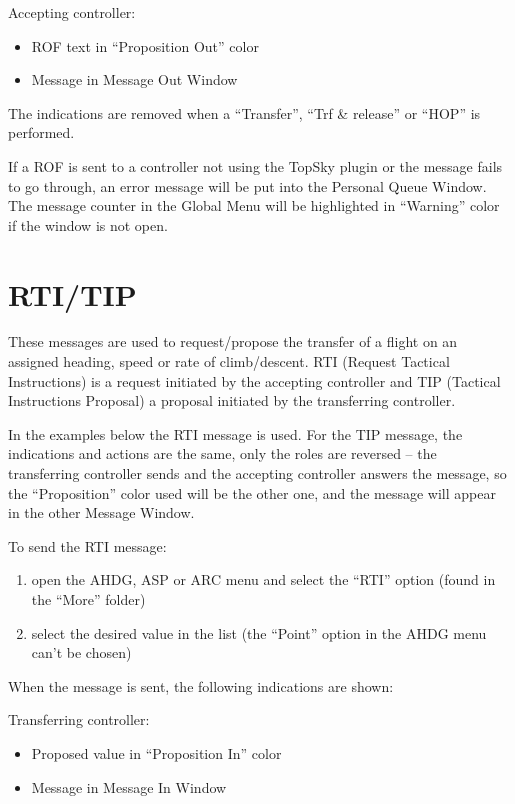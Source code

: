 \documentclass[11pt,a4paper,oldfontcommands]{memoir}
\newenvironment{Note}
  {\begin{shaded}\marginnote{\fbox{Note}}}
  {\end{shaded}}
\begin{document}
Accepting controller:

\begin{itemize}
  \item ROF text in “Proposition Out” color
  \item Message in Message Out Window
\end{itemize}

The indications are removed when a “Transfer”, “Trf \& release” or “HOP” is performed.

\begin{Note}
  If a ROF is sent to a controller not using the TopSky plugin or the message fails to go through, an error message will be put into the Personal Queue Window. The message counter in the Global Menu will be highlighted in “Warning” color if the window is not open.
\end{Note}

\section{RTI/TIP}

These messages are used to request/propose the transfer of a flight on an assigned heading, speed or rate of climb/descent. RTI (Request Tactical Instructions) is a request initiated by the accepting controller and TIP (Tactical Instructions Proposal) a proposal initiated by the transferring controller.

In the examples below the RTI message is used. For the TIP message, the indications and actions are the same, only the roles are reversed – the transferring controller sends and the accepting controller answers the message, so the “Proposition” color used will be the other one, and the message will appear in the other Message Window.

To send the RTI message:

\begin{enumerate}
  \item open the AHDG, ASP or ARC menu and select the “RTI” option (found in the “More” folder) 
  \item select the desired value in the list (the “Point” option in the AHDG menu can’t be chosen)
\end{enumerate}

When the message is sent, the following indications are shown:

Transferring controller:

\begin{itemize}
  \item Proposed value in “Proposition In” color
  \item Message in Message In Window
\end{itemize}
\end{document}
